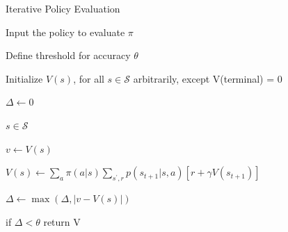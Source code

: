 \documentclass{beamer}
\begin{document}
\begin{frame}{Iterative Policy Evaluation}


\begin{algorithm}[H]
\caption{Iterative Policy Evaluation}


\vspace{1mm}
Input the policy to evaluate $\pi$

\vspace{0.5mm}

Define threshold for accuracy $\theta$

\vspace{0.5mm}

Initialize $V(s)$, for all $s \in \mathcal{S}$ arbitrarily, except V(terminal) = 0

\vspace{4mm}

$\Delta \leftarrow 0$
 

 \textbf{}  

 \hspace{5mm}  \textbf{}  $s \in \mathcal{S}$
   
   \vspace{0.5mm}
   
   \hspace{15mm} $v \leftarrow V(s)$
   
   \vspace{0.7mm}
   
   \hspace{15mm} $V(s) \leftarrow \sum_{a} \pi(a|s) \sum_{s^{\prime}, r} p(s_{t+1}| s, a)[r + \gamma V(s_{t+1})]$
   
   \vspace{0.7mm}
   
   \hspace{15mm} $\Delta \leftarrow \max(\Delta, |v - V(s)|)$
   
   \vspace{0.5mm}
   
   \hspace{5mm} if $\Delta < \theta$ return V
   \vspace{1mm}
   

\end{algorithm}

\end{frame}
\end{document}
